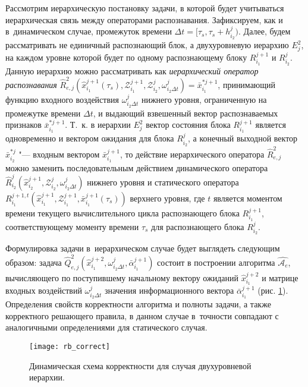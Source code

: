 Рассмотрим иерархическую постановку задачи, в которой будет учитываться иерархическая связь между операторами распознавания. Зафиксируем, как и в~динамическом случае, промежуток времени $\Delta t=[\tau_s,\tau_s+h_{i_2}^j)$. Далее, будем рассматривать не единичный распознающий блок, а двухуровневую иерархию $E_j^2$, на каждом уровне которой будет по одному распознающему блоку $R_{i_1}^{j+1}$ и $R_{i_2}^j$. Данную иерархию можно рассматривать как \textit{иерархический оператор распознавания} $\hat R_{e,j}^2(\hat x_{i_1}^{j+1}(\tau_s),\mathcal Z_{i_1}^{j+1},\mathcal Z_{i_2}^j,\omega_{i_2\Delta t}^j)=\bar x_{i_1}^{*j+1}$, принимающий функцию входного воздействия $\omega_{i_2\Delta t}^j$ нижнего уровня, ограниченную на промежутке времени $\Delta t$, и выдающий взвешенный вектор распознаваемых признаков $\bar x_{i_1}^{*j+1}$. Т.~к. в иерархии $E_j^2$ вектор состояния блока $R_{i_1}^{j+1}$ является одновременно и вектором ожидания для блока $R_{i_2}^j$, а конечный выходной вектор $\bar x_{i_2}^{*j}$ "--- входным вектором $\bar x_{i_1}^{j+1}$, то действие иерархического оператора $\hat R_{e,j}^2$ можно заменить последовательным действием динамического оператора $\hat R_{i_2}^j(\hat x _{i_2}^{j+1},\mathcal Z_{i_2}^j,\omega_{i_2\Delta t}^j)$ нижнего уровня и статического оператора $R_{i_1}^{j+1,t}(\hat x _{i_1}^{j+1},\mathcal Z_{i_1}^{j+1},\bar x_{i_1}^{j+1}(\tau_s))$ верхнего уровня, где $t$ является моментом времени текущего вычислительного цикла распознающего блока $R_{i_1}^{j+1}$, соответствующему моменту времени $\tau_s$ для распознающего блока $R_{i_2}^j$.

Формулировка задачи в~иерархическом случае будет выглядеть следующим образом: задача $\hat Q_{e,j}^2(\hat x_{i_1}^{j+2},\omega_{i_2\Delta t}^j,\bar\alpha_{i_1}^{j+1})$ состоит в построении алгоритма $\hat{\mathcal A_e}$, вычисляющего по поступившему начальному вектору ожиданий $\hat x_{i_1}^{j+2}$ и матрице входных воздействий $\omega_{i_2\Delta t}^j$ значения информационного вектора $\bar\alpha_{i_1}^{j+1}$ (рис. \ref{fig:rb_correct_hier}). Определения свойств корректности алгоритма и полноты задачи, а также корректного решающего правила, в данном случае в~точности совпадают с аналогичными определениями для статического случая.

\begin{figure}[h]
	\centering
	\texttt{[image: rb\_correct]}
	\caption{Динамическая схема корректности для случая двухуровневой иерархии.}
	\label{fig:rb_correct_hier}
\end{figure}

